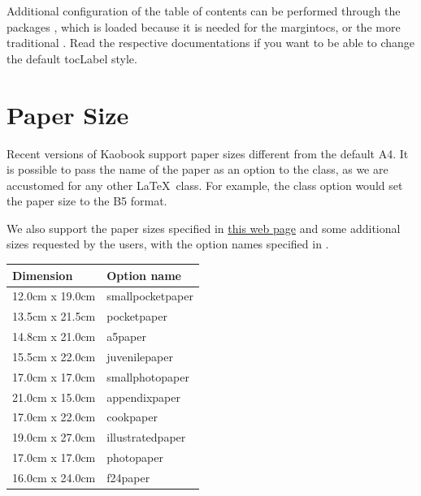 Additional configuration of the table of contents can be performed 
through the packages , which is loaded because it is 
needed for the margintocs, or the more traditional . 
Read the respective documentations if you want to be able to change the 
default \acrshort{tocLabel} style.

\section{Paper Size}

Recent versions of Kaobook support paper sizes different from the
default A4. It is possible to pass the name of the paper as an option
to the class, as we are accustomed for any other \LaTeX\ class. For
example, the class option  would set the paper size
to the B5 format.

We also support the paper sizes specified in
\href{https://www.bod.de/hilfe/hilfe-und-service.html?cmd=SINGLE\&entryID=2494\_GER\_WSS\&eo=2\&title=welche-buchformate-gibt-es}{this
web page} and some additional sizes requested by the users, with the 
option names specified in .

\begin{margintable}[*-6]
	\caption[Non-standard paper sizes]{Some non-standard paper sizes supported by kaobook.}
	\begin{tabular}{ll}
		\toprule
		Dimension & Option name \\
		\midrule
		12.0cm x 19.0cm & smallpocketpaper \\
		13.5cm x 21.5cm & pocketpaper \\
		14.8cm x 21.0cm & a5paper \\
		15.5cm x 22.0cm & juvenilepaper \\
		17.0cm x 17.0cm & smallphotopaper \\
		21.0cm x 15.0cm & appendixpaper \\
		17.0cm x 22.0cm & cookpaper \\
		19.0cm x 27.0cm & illustratedpaper \\
		17.0cm x 17.0cm & photopaper \\
		16.0cm x 24.0cm & f24paper \\
		\bottomrule
	\end{tabular}
\end{margintable}

